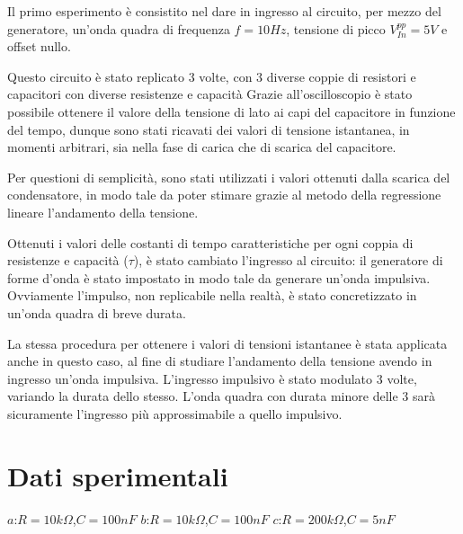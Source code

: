     Il primo esperimento è consistito nel dare in ingresso al circuito, per mezzo del generatore,
    un'onda quadra di frequenza $f = 10Hz$, tensione di picco $V_{In}^{pp} = 5V$ e offset nullo.\par
    Questo circuito è stato replicato 3 volte, con 3 diverse coppie di resistori e capacitori con diverse
    resistenze e capacità
    Grazie all'oscilloscopio è stato possibile ottenere il valore della tensione di lato ai capi 
    del capacitore in funzione del tempo, dunque sono stati ricavati dei valori di tensione istantanea,
    in momenti arbitrari, sia nella fase di carica che di scarica del capacitore.  \par
    Per questioni di semplicità, sono stati utilizzati i valori ottenuti dalla scarica del condensatore, in modo tale
    da poter stimare grazie al metodo della regressione lineare l'andamento della tensione.\par
    Ottenuti i valori delle costanti di tempo caratteristiche per ogni coppia di resistenze e capacità ($\tau$),
    è stato cambiato l'ingresso al circuito: il generatore di forme d'onda è stato impostato in modo tale da generare
    un'onda impulsiva. Ovviamente l'impulso, non replicabile nella realtà, è stato concretizzato in un'onda quadra di breve
    durata. \par
    La stessa procedura per ottenere i valori di tensioni istantanee è stata applicata anche in questo caso,
    al fine di studiare l'andamento della tensione avendo in ingresso un'onda impulsiva.
    L'ingresso impulsivo è stato modulato 3 volte, variando la durata dello stesso.
    L'onda quadra con durata minore delle 3 sarà sicuramente l'ingresso più approssimabile a quello impulsivo. \par
    

    \section{Dati sperimentali}
    $a$:$R = 10k\Omega$,$C = 100nF$
    \hspace{0.90 cm} $b$:$R = 10k\Omega$,$C = 100nF$
    \hspace{0.90 cm} $c$:$R = 200k\Omega$,$C = 5nF$

